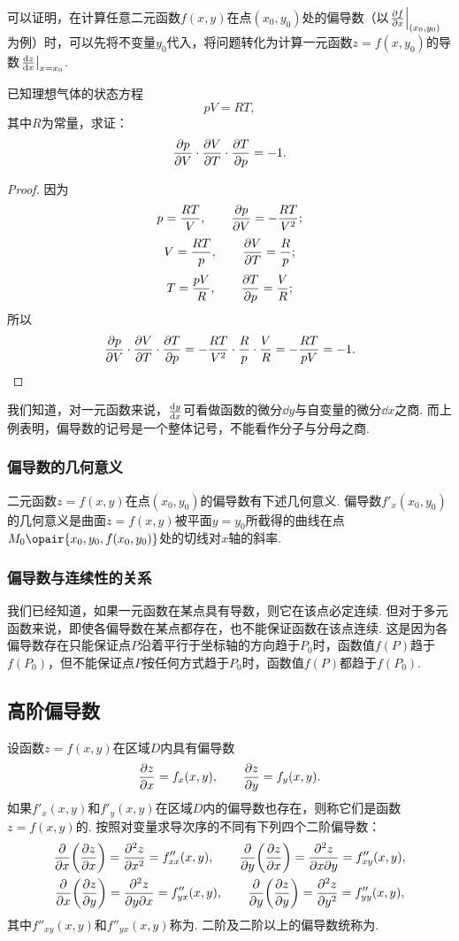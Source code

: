 可以证明，在计算任意二元函数\(f(x,y)\)在点\((x_0,y_0)\)处的偏导数（以\(\eval{\pdv{f}{x}}_{(x_0,y_0)}\)为例）时，可以先将不变量\(y_0\)代入，将问题转化为计算一元函数\(z = f(x, y_0)\)的导数\(\eval{\dv{z}{x}}_{x=x_0}\).

\begin{example}
已知理想气体的状态方程\[
pV = RT,
\]其中\(R\)为常量，求证：\[
\pdv{p}{V} \cdot \pdv{V}{T} \cdot \pdv{T}{p} = -1.
\]
\begin{proof}
因为\[
p = \frac{RT}{V}, \qquad \pdv{p}{V} = -\frac{RT}{V^2};
\]\[
V = \frac{RT}{p}, \qquad \pdv{V}{T} = \frac{R}{p};
\]\[
T = \frac{pV}{R}, \qquad \pdv{T}{p} = \frac{V}{R};
\]所以\[
\pdv{p}{V} \cdot \pdv{V}{T} \cdot \pdv{T}{p}
= -\frac{RT}{V^2} \cdot \frac{R}{p} \cdot \frac{V}{R}
= -\frac{RT}{pV} = -1.
\qedhere
\]
\end{proof}
\end{example}

我们知道，对一元函数来说，\(\dv{y}{x}\)可看做函数的微分\(\dd{y}\)与自变量的微分\(\dd{x}\)之商.
而上例表明，偏导数的记号是一个整体记号，不能看作分子与分母之商.

\subsubsection{偏导数的几何意义}
二元函数\(z=f(x,y)\)在点\((x_0,y_0)\)的偏导数有下述几何意义.
偏导数\(f'_x(x_0,y_0)\)的几何意义是曲面\(z=f(x,y)\)被平面\(y=y_0\)所截得的曲线在点\(M_0\opair{x_0,y_0,f(x_0,y_0)}\)处的切线对\(x\)轴的斜率.

\subsubsection{偏导数与连续性的关系}
我们已经知道，如果一元函数在某点具有导数，则它在该点必定连续.
但对于多元函数来说，即使各偏导数在某点都存在，也不能保证函数在该点连续.
这是因为各偏导数存在只能保证点\(P\)沿着平行于坐标轴的方向趋于\(P_0\)时，函数值\(f(P)\)趋于\(f(P_0)\)，但不能保证点\(P\)按任何方式趋于\(P_0\)时，函数值\(f(P)\)都趋于\(f(P_0)\).

\subsection{高阶偏导数}
\begin{definition}
设函数\(z=f(x,y)\)在区域\(D\)内具有偏导数\[
\pdv{z}{x} = f_x(x,y), \qquad
\pdv{z}{y} = f_y(x,y).
\]如果\(f'_x(x,y)\)和\(f'_y(x,y)\)在区域\(D\)内的偏导数也存在，则称它们是函数\(z=f(x,y)\)的.
按照对变量求导次序的不同有下列四个二阶偏导数：
\begin{gather*}
\pdv{x}(\pdv{z}{x}) = \pdv[2]{z}{x} = f''_{xx}(x,y),
\qquad
\pdv{y}(\pdv{z}{x}) = \pdv{z}{x}{y} = f''_{xy}(x,y), \\
\pdv{x}(\pdv{z}{y}) = \pdv{z}{y}{x} = f''_{yx}(x,y),
\qquad
\pdv{y}(\pdv{z}{y}) = \pdv[2]{z}{y} = f''_{yy}(x,y),
\end{gather*}
其中\(f''_{xy}(x,y)\)和\(f''_{yx}(x,y)\)称为.
二阶及二阶以上的偏导数统称为.
\end{definition}

